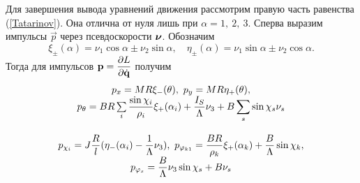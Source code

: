 Для завершения вывода уравнений движения рассмотрим правую часть равенства (\ref{Tatarinov}). Она отлична от нуля лишь при $\alpha = 1,\ 2,\ 3$. Сперва выразим импульсы $\vec{p}$ через псевдоскорости $\boldsymbol{\mathbf{\nu}}$. Обозначим
$$
    \xi_\pm(\alpha) = \nu_1\cos\alpha \pm \nu_2\sin\alpha, \quad \eta_\pm(\alpha) = \nu_1\sin\alpha \pm \nu_2\cos\alpha.
$$
Тогда для импульсов $\boldsymbol{\mathbf{p}} = \displaystyle\frac{\displaystyle \partial L}{\displaystyle \partial \dot{\boldsymbol{\mathbf{q}}}}$ получим
\begin{equation}\label{p}
    \begin{array}{c}
        p_x  =  MR\xi_-(\theta), \ p_y = MR\eta_+(\theta),\\
        p_\theta  =  BR\sum\limits_i\ddfrac{\sin\chi_i}{\rho_i}\xi_+(\alpha_i) + \ddfrac{I_S}{\Lambda}\nu_3 + B\sum\limits_s\sin\chi_s\nu_s\vsp\\
        p_{\chi_i}  =  J\ddfrac{R}{l}(\eta_-(\alpha_i) - \ddfrac{1}{\Lambda}\nu_3), \ p_{\phi_{k1}}  =  \ddfrac{BR}{\rho_k}\xi_+(\alpha_k)+\ddfrac{B}{\Lambda}\sin\chi_k,\\
        p_{\phi_s}  =  \ddfrac{B}{\Lambda}\nu_3\sin\chi_s + B\nu_s
    \end{array}
\end{equation}

